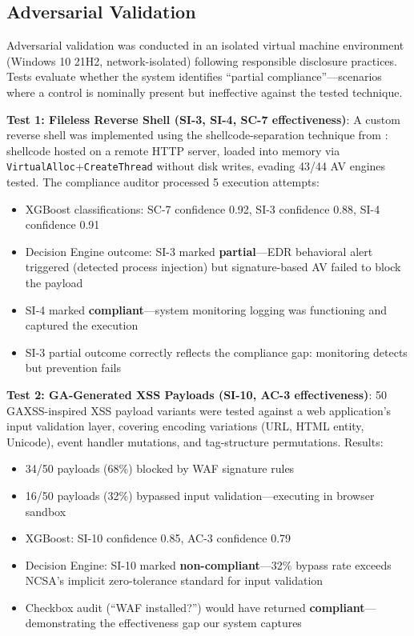 \documentclass[11pt,conference]{IEEEtran}
\begin{document}
\subsection{Adversarial Validation}
\label{sec:adversarial}

Adversarial validation was conducted in an isolated virtual machine environment (Windows 10 21H2, network-isolated) following responsible disclosure practices. Tests evaluate whether the system identifies ``partial compliance''---scenarios where a control is nominally present but ineffective against the tested technique.

\textbf{Test 1: Fileless Reverse Shell (SI-3, SI-4, SC-7 effectiveness)}: A custom reverse shell was implemented using the shellcode-separation technique from \cite{reverse_shell_paper}: shellcode hosted on a remote HTTP server, loaded into memory via \texttt{VirtualAlloc}+\texttt{CreateThread} without disk writes, evading 43/44 AV engines tested. The compliance auditor processed 5 execution attempts:
\begin{itemize}
    \item XGBoost classifications: SC-7 confidence 0.92, SI-3 confidence 0.88, SI-4 confidence 0.91
    \item Decision Engine outcome: SI-3 marked \textbf{partial}---EDR behavioral alert triggered (detected process injection) but signature-based AV failed to block the payload
    \item SI-4 marked \textbf{compliant}---system monitoring logging was functioning and captured the execution
    \item SI-3 partial outcome correctly reflects the compliance gap: monitoring detects but prevention fails
\end{itemize}

\textbf{Test 2: GA-Generated XSS Payloads (SI-10, AC-3 effectiveness)}: 50 GAXSS-inspired XSS payload variants were tested against a web application's input validation layer, covering encoding variations (URL, HTML entity, Unicode), event handler mutations, and tag-structure permutations. Results:
\begin{itemize}
    \item 34/50 payloads (68\%) blocked by WAF signature rules
    \item 16/50 payloads (32\%) bypassed input validation---executing in browser sandbox
    \item XGBoost: SI-10 confidence 0.85, AC-3 confidence 0.79
    \item Decision Engine: SI-10 marked \textbf{non-compliant}---32\% bypass rate exceeds NCSA's implicit zero-tolerance standard for input validation
    \item Checkbox audit (``WAF installed?'') would have returned \textbf{compliant}---demonstrating the effectiveness gap our system captures
\end{itemize}
\end{document}
